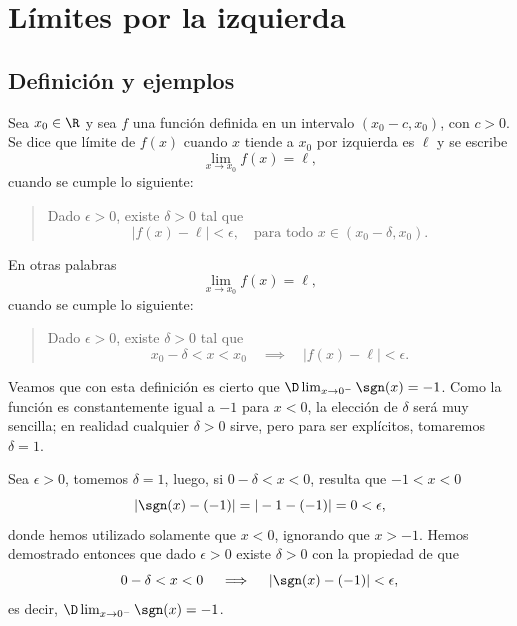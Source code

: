\begin{enumerate}

\end{enumerate}

\section{Límites por la izquierda}

\subsection{Definición y ejemplos}

\begin{definition}
    Sea $x_0\in\R$ y sea $f$ una función definida en un intervalo $(x_0-c,x_0)$, con $c>0$. Se dice que límite de $f(x)$ cuando $x$ tiende a $x_0$ por izquierda es $\ell$ y se escribe
    \[
    \lim_{x\to x_0}f(x)=\ell,
    \]
    cuando se cumple lo siguiente:
    \begin{quote}
        Dado $\epsilon > 0$, existe $\delta > 0$ tal que 
        \[
        |f(x)-\ell| < \epsilon, \quad\text{para todo $x\in (x_0-\delta,x_0)$}
        .
        \]
    \end{quote}
\end{definition}

\begin{remark}
        En otras palabras
    \[
    \lim_{x\to x_0}f(x)=\ell,
    \]
    cuando se cumple lo siguiente:
    \begin{quote}
        Dado $\epsilon > 0$, existe $\delta > 0$ tal que 
        \[
        x_0-\delta<x<x_0
        \quad\implies\quad |f(x)-\ell| < \epsilon.
        \]
    \end{quote}
\end{remark}

\begin{example}
Veamos que con esta definición es cierto que $\D\lim_{x\to0^-} \sgn(x)=-1$.
Como la función es constantemente igual a $-1$ para $x<0$, la elección de $\delta$ será muy sencilla; en realidad cualquier $\delta>0$ sirve, pero para ser explícitos, tomaremos $\delta=1$.

Sea $\epsilon > 0$, tomemos $\delta=1$, luego, si $0-\delta<x<0$, resulta que $-1<x<0$
\[
|\sgn(x)-(-1)| = |-1-(-1)|=0<\epsilon,
\]
donde hemos utilizado solamente que $x<0$, ignorando que $x>-1$.
Hemos demostrado entonces que dado $\epsilon>0$ existe $\delta>0$ con la propiedad de que
\[
0-\delta<x<0 \quad\implies\quad |\sgn(x)-(-1)|<\epsilon,
\]
es decir, $\D\lim_{x\to0^-} \sgn(x)=-1$.
\end{example}

